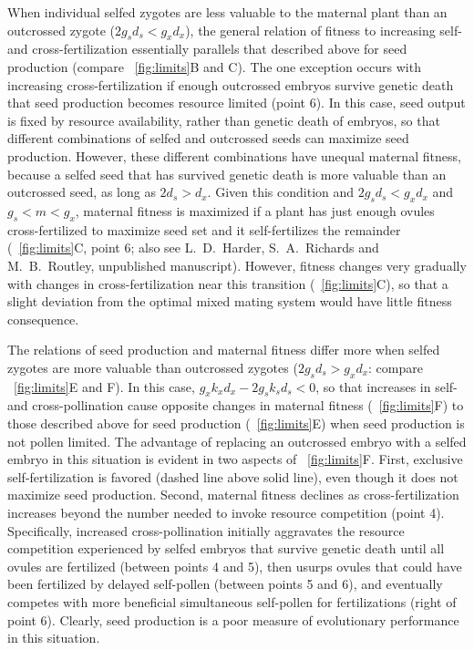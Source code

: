 \documentclass[letterpaper,titlepage]{scrartcl}
\newcommand{\OFMixedMating}{L.~D.~Harder, S.~A.~Richards and
  M.~B.~Routley, unpublished manuscript}
\begin{document}
When individual selfed zygotes are less valuable to the maternal plant
than an outcrossed zygote ($2g_{s}d_{s}<g_{x}d_{x}$), the general
relation of fitness to increasing self- and cross-fertilization
essentially parallels that described above for seed production
(compare {\fref}~\ref{fig:limits}B and C). The one exception occurs
with increasing cross-fertilization if enough outcrossed embryos
survive genetic death that seed production becomes resource limited
(point 6). In this case, seed output is fixed by resource
availability, rather than genetic death of embryos, so that different
combinations of selfed and outcrossed seeds can maximize seed
production. However, these different combinations have unequal
maternal fitness, because a selfed seed that has survived genetic
death is more valuable than an outcrossed seed, as long as
$2d_{s}>d_{x}$. Given this condition and $2g_{s}d_{s}<g_{x}d_{x}$ and
$g_{s}<m< g_{x}$, maternal fitness is maximized if a plant has just
enough ovules cross-fertilized to maximize seed set and it
self-fertilizes the remainder ({\fref}~\ref{fig:limits}C, point 6;
also see {\OFMixedMating}). However, fitness changes very gradually
with changes in cross-fertilization near this transition
({\fref}~\ref{fig:limits}C), so that a slight deviation from the
optimal mixed mating system would have little fitness consequence.

The relations of seed production and maternal fitness differ more when
selfed zygotes are more valuable than outcrossed zygotes
($2g_{s}d_{s}>g_{x}d_{x}$: compare {\fref}~\ref{fig:limits}E and
F). In this case, $g_{x}k_{x}d_{x}-2g_{s}k_{s}d_{s}<0$, so that
increases in self- and cross-pollination cause opposite changes in
maternal fitness ({\fref}~\ref{fig:limits}F) to those described above
for seed production ({\fref}~\ref{fig:limits}E) when seed production
is not pollen limited. The advantage of replacing an outcrossed embryo
with a selfed embryo in this situation is evident in two aspects of
{\fref}~\ref{fig:limits}F. First, exclusive self-fertilization is
favored (dashed line above solid line), even though it does not
maximize seed production. Second, maternal fitness declines as
cross-fertilization increases beyond the number needed to invoke
resource competition (point 4). Specifically, increased
cross-pollination initially aggravates the resource competition
experienced by selfed embryos that survive genetic death until all
ovules are fertilized (between points 4 and 5), then usurps ovules
that could have been fertilized by delayed self-pollen (between points
5 and 6), and eventually competes with more beneficial simultaneous
self-pollen for fertilizations (right of point 6). Clearly, seed
production is a poor measure of evolutionary performance in this
situation.
\end{document}
